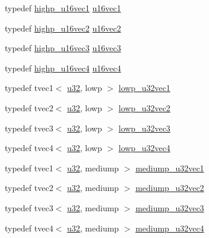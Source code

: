 \begin{DoxyCompactItemize}
typedef \hyperlink{namespaceglm_a7dc03cbaf98b6e427cc4d3c83d446c54}{highp\+\_\+u16vec1} \hyperlink{group__gtc__type__precision_ga809cb55e5fed3456686aae96e7e8684c}{u16vec1}
\item 
typedef \hyperlink{namespaceglm_a9c2e311542a1eec13b15e959036e0c34}{highp\+\_\+u16vec2} \hyperlink{group__gtc__type__precision_ga10e8900b9610f930772aa55aee8e3121}{u16vec2}
\item 
typedef \hyperlink{namespaceglm_aba289b0588476cf2d90f11029c47461f}{highp\+\_\+u16vec3} \hyperlink{group__gtc__type__precision_ga947d0d003e016eaf2038d6843b427257}{u16vec3}
\item 
typedef \hyperlink{namespaceglm_a9d020e4972de8e94684c49f2587b1235}{highp\+\_\+u16vec4} \hyperlink{group__gtc__type__precision_ga87d1f39c523b4d6d4de0c2778afe5474}{u16vec4}
\item 
typedef tvec1$<$ \hyperlink{group__gtc__type__precision_ga54e837745059fd29017bed71cfa0a8db}{u32}, lowp $>$ \hyperlink{namespaceglm_a285d2823d7fe4f3969f838b31bcd4d32}{lowp\+\_\+u32vec1}
\item 
typedef tvec2$<$ \hyperlink{group__gtc__type__precision_ga54e837745059fd29017bed71cfa0a8db}{u32}, lowp $>$ \hyperlink{namespaceglm_a85eccbd086ad8390173a7c243bb0e90b}{lowp\+\_\+u32vec2}
\item 
typedef tvec3$<$ \hyperlink{group__gtc__type__precision_ga54e837745059fd29017bed71cfa0a8db}{u32}, lowp $>$ \hyperlink{namespaceglm_a2639b769b47b8fd609913bf38d3103c4}{lowp\+\_\+u32vec3}
\item 
typedef tvec4$<$ \hyperlink{group__gtc__type__precision_ga54e837745059fd29017bed71cfa0a8db}{u32}, lowp $>$ \hyperlink{namespaceglm_ab671efbf3b747eb8422971b60c925300}{lowp\+\_\+u32vec4}
\item 
typedef tvec1$<$ \hyperlink{group__gtc__type__precision_ga54e837745059fd29017bed71cfa0a8db}{u32}, mediump $>$ \hyperlink{namespaceglm_a9226c5a5159a6da4fd4385a3e5036217}{mediump\+\_\+u32vec1}
\item 
typedef tvec2$<$ \hyperlink{group__gtc__type__precision_ga54e837745059fd29017bed71cfa0a8db}{u32}, mediump $>$ \hyperlink{namespaceglm_a1f1cfdf3e7d134d53e46ac233feb73d8}{mediump\+\_\+u32vec2}
\item 
typedef tvec3$<$ \hyperlink{group__gtc__type__precision_ga54e837745059fd29017bed71cfa0a8db}{u32}, mediump $>$ \hyperlink{namespaceglm_aa83a4e6ef9880f1cefb6224a6f8676b6}{mediump\+\_\+u32vec3}
\item 
typedef tvec4$<$ \hyperlink{group__gtc__type__precision_ga54e837745059fd29017bed71cfa0a8db}{u32}, mediump $>$ \hyperlink{namespaceglm_aed40e7b751d8cdd3fe747abd19d92790}{mediump\+\_\+u32vec4}

\end{DoxyCompactItemize}
